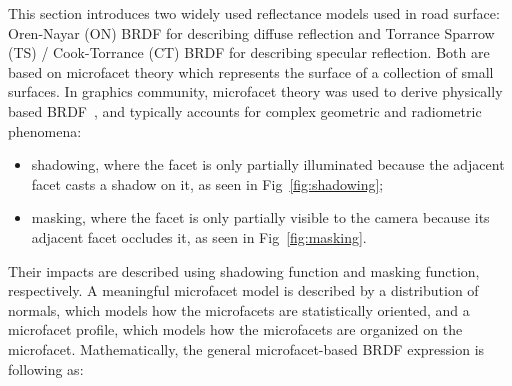 This section introduces two widely used reflectance models used in road surface: Oren-Nayar (ON) BRDF for describing diffuse reflection and Torrance Sparrow (TS) / Cook-Torrance (CT) BRDF for describing specular reflection.
Both are based on microfacet theory which represents the surface of a collection of small surfaces.
In graphics community, microfacet theory was used to derive physically based BRDF~\cite{2014_Heitz}, and typically accounts for complex geometric and radiometric phenomena:
\begin{itemize}
    \item shadowing, where the facet is only partially illuminated because the adjacent facet casts a shadow on it, as seen in Fig~\ref{fig:shadowing};
    \item masking, where the facet is only partially visible to the camera because its adjacent facet occludes it, as seen in Fig~\ref{fig:masking}.
\end{itemize}
Their impacts are described using shadowing function and masking function, respectively.
A meaningful microfacet model is described by a distribution of normals, which models how the microfacets are statistically oriented, and a microfacet profile, which models how the microfacets are organized on the microfacet.
Mathematically, the general microfacet-based BRDF expression is following as:


